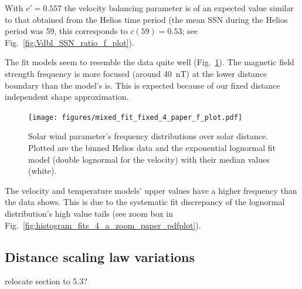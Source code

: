 With $c' = 0.557$ the velocity balancing parameter is of an expected value similar to that obtained from the Helios time period (the mean SSN during the Helios period was 59, this corresponds to $c(59) = 0.53$; see Fig.~\ref{fig:Vdbl_SSN_ratio_f_plot}).

The fit models seem to resemble the data quite well (Fig.~\ref{fig:mixed_fit_fixed_4_paper_f_plot}). The magnetic field strength frequency is more focused (around \SI{40}{nT}) at the lower distance boundary than the model's is. This is expected because of our fixed distance independent shape approximation.
\begin{figure}
	\texttt{[image: figures/mixed\_fit\_fixed\_4\_paper\_f\_plot.pdf]}
	\caption{Solar wind parameter's frequency distributions over solar distance. Plotted are the binned Helios data and the exponential lognormal fit model (double lognormal for the velocity) with their median values (white).}
	\label{fig:mixed_fit_fixed_4_paper_f_plot}
\end{figure}
The velocity and temperature models' upper values have a higher frequency than the data shows. This is due to the systematic fit discrepancy of the lognormal distribution's high value tails (see zoom box in Fig.~\ref{fig:histogram_fits_4_a_zoom_paper_pdfplot}).

\subsection{Distance scaling law variations}
\label{sec:distance_scaling_law_variations}

relocate section to 5.3?\\

